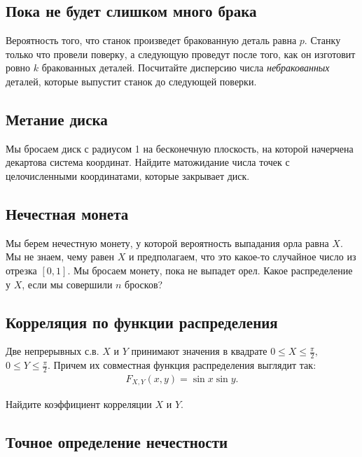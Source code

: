 \documentclass[12pt]{article}
\begin{document}
\subsection{Пока не будет слишком много брака}

Вероятность того, что станок произведет бракованную деталь равна $p$. Станку только что провели поверку, а следующую проведут после того, как он изготовит ровно $k$ бракованных деталей. Посчитайте дисперсию числа \emph{небракованных} деталей, которые выпустит станок до следующей поверки.



\subsection{Метание диска}

Мы бросаем диск с радиусом 1 на бесконечную плоскость, на которой начерчена декартова система координат. Найдите матожидание числа точек с целочисленными координатами, которые закрывает диск.



\subsection{Нечестная монета}

Мы берем нечестную монету, у которой вероятность выпадания орла равна $X$. Мы не знаем, чему равен $X$ и предполагаем, что это какое-то случайное число из отрезка $[0, 1]$. Мы бросаем монету, пока не выпадет орел. Какое распределение у $X$, если мы совершили $n$ бросков?



\subsection{Корреляция по функции распределения}

Две непрерывных с.в. $X$ и $Y$ принимают значения в квадрате $0 \le X \le \frac{\pi}{2},$ $0 \le Y \le \frac{\pi}{2}$. Причем их совместная функция распределения выглядит так:
\begin{align*}
    F_{X, Y} (x, y) = \sin x \sin y.
\end{align*}

Найдите коэффициент корреляции $X$ и $Y$.



\subsection{Точное определение нечестности}
\end{document}
